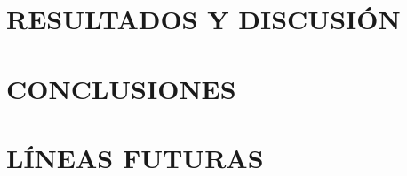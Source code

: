 \documentclass[a4paper, 12pt, spanish, twoside]{article}
\begin{document}
\clearpage





\newpage
\section{RESULTADOS Y DISCUSIÓN} \label{sec:resultados_y_discusion}

\clearpage





\newpage
\section{CONCLUSIONES} \label{sec:conclusiones}

\clearpage





\newpage
\section{LÍNEAS FUTURAS} \label{sec:lineas_futuras}

\clearpage





\newpage
\appto{\bibsetup}{\sloppy}
\printbibliography[heading=bibintoc, title=BIBLIOGRAFÍA] %
\end{document}
